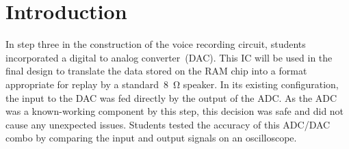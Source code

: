\section{Introduction}

In step three in the construction of the voice recording circuit, students
incorporated a digital to analog converter~(DAC).  This IC will be used in the
final design to translate the data stored on the RAM chip into a format
appropriate for replay by a standard~\SI{8}{\ohm} speaker.  In its existing
configuration, the input to the DAC was fed directly by the output of the ADC.
As the ADC was a known-working component by this step, this decision was safe
and did not cause any unexpected issues.  Students tested the accuracy of this
ADC/DAC combo by comparing the input and output signals on an oscilloscope.
